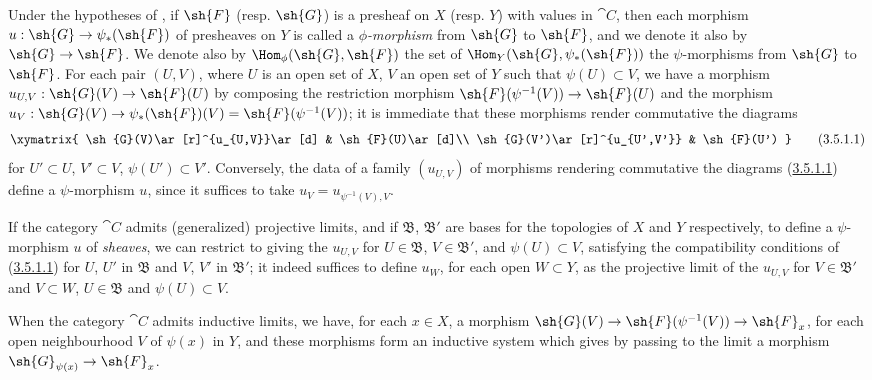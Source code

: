 \begin{env}[3.5.1]
\label{0.3.5.1}
Under the hypotheses of , if $\sh{F}$ (resp. $\sh{G}$) is a
presheaf on $X$ (resp. $Y$) with values in $\cat{C}$, then each morphism
$u:\sh{G}\to\psi_*(\sh{F})$ of presheaves on $Y$ is called a
\emph{$\phi$-morphism} from $\sh{G}$ to $\sh{F}$, and we denote it also by
$\sh{G}\to\sh{F}$. We denote also by $\Hom_\phi(\sh{G},\sh{F})$ the set of
$\Hom_Y(\sh{G},\psi_*(\sh{F}))$ the $\psi$-morphisms from $\sh{G}$ to $\sh{F}$.
For each pair $(U,V)$, where $U$ is an open set of $X$, $V$ an open set of $Y$
such that $\psi(U)\subset V$, we have a morphism $u_{U,V}:\sh{G}(V)\to\sh{F}(U)$
by composing the restriction morphism $\sh{F}(\psi^{-1}(V))\to\sh{F}(U)$ and the
morphism $u_V:\sh{G}(V)\to\psi_*(\sh{F})(V)=\sh{F}(\psi^{-1}(V))$; it is
immediate that these morphisms render commutative the diagrams
\[
\label{0.3.5.1.1}
  \xymatrix{
    \sh{G}(V)\ar[r]^{u_{U,V}}\ar[d] &
    \sh{F}(U)\ar[d]\\
    \sh{G}(V')\ar[r]^{u_{U',V'}} &
    \sh{F}(U')
  }
  \tag{3.5.1.1}
\]
for $U'\subset U$, $V'\subset V$, $\psi(U')\subset V'$. Conversely, the data of
a family $(u_{U,V})$ of morphisms rendering commutative the diagrams (\hyperref[0.3.5.1.1]{3.5.1.1})
define a $\psi$-morphism $u$, since it suffices to take
$u_V=u_{\psi^{-1}(V),V}$.

If the category $\cat{C}$ admits (generalized) projective limits, and if
$\mathfrak{B}$, $\mathfrak{B}'$ are bases for the topologies of $X$ and $Y$
respectively, to define a $\psi$-morphism $u$ of \emph{sheaves}, we can restrict
to giving the $u_{U,V}$ for $U\in\mathfrak{B}$, $V\in\mathfrak{B}'$, and
$\psi(U)\subset V$, satisfying the compatibility conditions of (\hyperref[0.3.5.1.1]{3.5.1.1}) for
$U$, $U'$ in $\mathfrak{B}$ and $V$, $V'$ in $\mathfrak{B}'$; it indeed suffices
to define $u_W$, for each open $W\subset Y$, as the projective limit of the
$u_{U,V}$ for $V\in\mathfrak{B}'$ and $V\subset W$, $U\in\mathfrak{B}$ and
$\psi(U)\subset V$.

When the category $\cat{C}$ admits inductive limits, we have, for each $x\in X$, a
morphism $\sh{G}(V)\to\sh{F}(\psi^{-1}(V))\to\sh{F}_x$, for each open
neighbourhood $V$ of $\psi(x)$ in $Y$, and these morphisms form an inductive
system which gives by passing to the limit a morphism
$\sh{G}_{\psi(x)}\to\sh{F}_x$.
\end{env}

